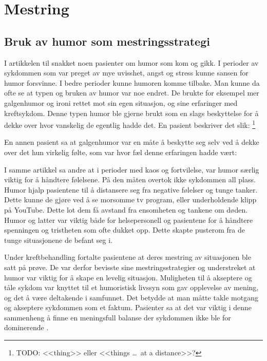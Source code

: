 \section{Mestring}

\subsection{Bruk av humor som mestringsstrategi}

I artikkelen til  snakket noen pasienter om humor som kom
og gikk. I perioder av sykdommen som var preget av mye uvisshet, angst og
stress kunne sansen for humor forsvinne. I bedre perioder kunne humoren komme
tilbake.  Man kunne da ofte se at typen og bruken av humor var noe endret. De
brukte for eksempel mer galgenhumor og ironi rettet mot sin egen situasjon, og
sine erfaringer med kreftsykdom. Denne typen humor ble gjerne brukt som en
slags beskyttelse for å dekke over hvor vanskelig de egentlig hadde det. En
pasient beskriver det slik: \footnote{TODO: <<thing>> eller <<things \ldots\ at a distance>>?}

En annen pasient sa at galgenhumor var en måte å beskytte seg selv ved å dekke
over det hun virkelig følte, som var hvor fæl denne erfaringen hadde vært:

I samme artikkel sa andre at i perioder med kaos og fortvilelse, var humor
særlig viktig for å håndtere følelsene. På den måten overtok ikke sykdommen all
plass. Humor hjalp pasientene til å distansere seg fra negative følelser og
tunge tanker. Dette kunne de gjøre ved å se morsomme tv program, eller
underholdende klipp på YouTube. Dette lot dem få avstand fra ensomheten og
tankene om døden. Humor og latter var viktig både for helsepersonell og
pasientene for å håndtere spenningen og tristheten som ofte dukket opp. Dette
skapte pusterom fra de tunge situasjonene de befant seg i.

Under kreftbehandling fortalte pasientene at deres mestring av situasjonen ble
satt på prøve. De var derfor bevisste sine mestringsstrategier og understreket
at humor var viktig for å skape en levelig situasjon. Muligheten til å
akseptere og tåle sykdom var knyttet til et humoristisk livssyn som gav
opplevelse av mening, og det å være deltakende i samfunnet. Det betydde at man
måtte takle motgang og akseptere sykdommen som et faktum. Pasienter sa at det
var viktig i denne sammenheng å finne en meningsfull balanse der sykdommen ikke
ble for dominerende \cite{roaldsen2015}.

